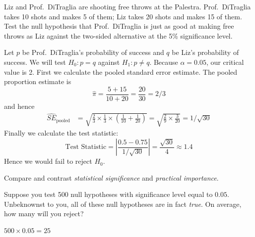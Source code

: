 \documentclass[addpoints,12pt]{exam}
\begin{document}
\begin{questions}

\question Liz and Prof.\ DiTraglia are shooting free throws at the Palestra. Prof.\ DiTraglia takes 10 shots and makes 5 of them; Liz takes 20 shots and makes 15 of them. Test the null hypothesis that Prof.\ DiTraglia is just as good at making free throws as Liz against the two-sided alternative at the 5\% significance level. 
\begin{solution}
  Let $p$ be Prof.\ DiTraglia's probability of success and $q$ be Liz's probability of success.
  We will test $H_0\colon p = q$ against $H_1\colon p \neq q$.
  Because $\alpha = 0.05$, our critical value is 2.
  First we calculate the pooled standard error estimate.
  The pooled proportion estimate is
  \[
    \widehat{\pi} = \frac{5 + 15}{10 + 20} = \frac{20}{30} = 2/3 
  \]
  and hence
  \begin{align*}
    \widehat{SE}_{\text{pooled}} &= 
    \sqrt{\frac{2}{3} \times \frac{1}{3}  \times \left( \frac{1}{10} + \frac{1}{20} \right)} 
    = \sqrt{\frac{2}{9} \times \frac{3}{20}} = 1/\sqrt{30}
  \end{align*}
  Finally we calculate the test statistic:
  \[
    \text{Test Statistic} = \left|\frac{0.5 - 0.75}{1/\sqrt{30}}\right| = \frac{\sqrt{30}}{4} \approx 1.4
  \]
  Hence we would fail to reject $H_0$.
\end{solution}

\question Compare and contrast \emph{statistical significance} and \emph{practical importance}.

\question Suppose you test 500 null hypotheses with significance level equal to $0.05$. Unbeknownst to you, all of these null hypotheses are in fact \emph{true}. On average, how many will you reject?
\begin{solution}
  $500 \times 0.05 = 25$
\end{solution}


\end{questions}
\end{document}
